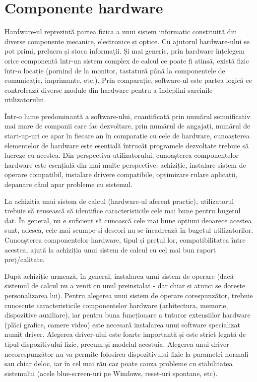 \chapter{Componente hardware}
\label{chapter:hardware}

Hardware-ul reprezintă partea fizica a unui sistem informatic constituită din
diverse componente mecanice, electronice și optice. Cu ajutorul hardware-ului
se pot primi, prelucra și stoca informații. Și mai generic, prin hardware
înțelegem orice componentă într-un sistem complex de calcul ce poate fi atinsă,
există fizic într-o locație (pornind de la monitor, tastatură până la
componentele de comunicație, imprimante, etc.). Prin comparație, software-ul
este partea logică ce controlează diverse module din hardware pentru a îndeplini
sarcinile utilizatorului.

Într-o lume predominantă a software-ului, cuantificată prin numărul semnificativ
mai mare de companii care fac dezvoltare, prin numărul de angajați, numărul de
start-up-uri ce apar în fiecare an în comparație cu cele de hardware,
cunoașterea elementelor de hardware este esențială întrucât programele
dezvoltate trebuie să lucreze cu acestea. Din perspectiva utilizatorului,
cunoașterea componentelor hardware este esențială din mai multe perspective:
achiziție, instalare sistem de operare compatibil, instalare drivere
compatibile, optimizare rulare aplicații, depanare când apar probleme cu
sistemul.

La achiziția unui sistem de calcul (hardware-ul aferent practic), utilizatorul
trebuie să reușească să identifice caracteristicile cele mai bune pentru bugetul
dat. În general, nu e suficient să cunoască cele mai bune opțiuni deoarece
acestea sunt, adesea, cele mai scumpe și deseori nu se încadrează în bugetul
utilizatorilor. Cunoașterea componentelor hardware, tipul și prețul lor,
compatibilitatea între acestea, ajută la achiziția unui sistem de calcul cu cel
mai bun raport preț/calitate.

După achiziție urmează, în general, instalarea unui sistem de operare (dacă
sistemul de calcul nu a venit cu unul preinstalat - dar chiar și atunci se
dorește personalizarea lui). Pentru alegerea unui sistem de operare
corespunzător, trebuie cunoscute caracteristicile componentelor hardware
(arhitectura, memorie, dispozitive auxiliare), iar pentru buna funcționare a
tuturor extensiilor hardware (plăci grafice, camere video) este necesară
instalarea unui software specializat numit driver. Alegerea driver-ului este
foarte importantă și este strict legată de tipul dispozitivului fizic, precum și
modelul acestuia. Alegerea unui driver necorespunzător nu va permite folosirea
dispozitivului fizic la parametri normali sau chiar deloc, iar în cel mai rău
caz poate cauza probleme cu stabilitatea sistemului (acele blue-screen-uri pe
Windows, reset-uri spontane, etc).

